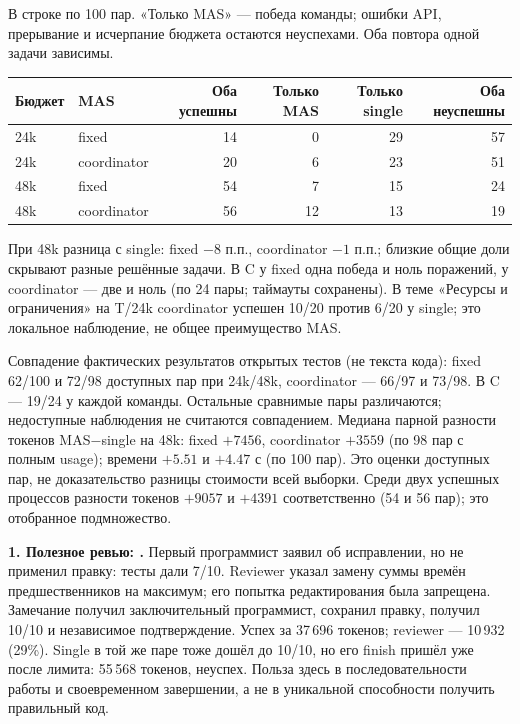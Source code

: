 \documentclass[10pt,a4paper]{article}
\newcommand{\sectionline}[1]{\par\vspace{4pt}{\sffamily\bfseries #1}\par\vspace{2pt}}
\newcommand{\id}[1]{{\fontsize{8}{10}\selectfont\texttt{\detokenize{#1}}}}
\begin{document}
\sectionline{Сравнение на одинаковых task/budget/repeat}
В строке по 100 пар. «Только MAS» --- победа команды; ошибки API, прерывание и
исчерпание бюджета остаются неуспехами. Оба повтора одной задачи зависимы.
\begin{center}\small
\begin{tabular}{llrrrr}
\toprule
Бюджет & MAS & Оба успешны & Только MAS & Только single & Оба неуспешны\\
\midrule
24k & fixed & 14 & 0 & 29 & 57\\
24k & coordinator & 20 & 6 & 23 & 51\\
48k & fixed & 54 & 7 & 15 & 24\\
48k & coordinator & 56 & 12 & 13 & 19\\
\bottomrule
\end{tabular}
\end{center}
При 48k разница с single: fixed $-8$ п.п., coordinator $-1$ п.п.; близкие общие
доли скрывают разные решённые задачи. В C у fixed одна победа и ноль поражений,
у coordinator --- две и ноль (по 24 пары; таймауты сохранены).
В теме «Ресурсы и ограничения» на T/24k coordinator успешен 10/20 против 6/20
у single; это локальное наблюдение, не общее преимущество MAS.

Совпадение фактических результатов открытых тестов (не текста кода): fixed
62/100 и 72/98 доступных пар при 24k/48k, coordinator --- 66/97 и 73/98.
В C --- 19/24 у каждой команды. Остальные сравнимые пары различаются;
недоступные наблюдения не считаются совпадением.
Медиана парной разности токенов MAS$-$single на 48k: fixed $+7456$,
coordinator $+3559$ (по 98 пар с полным usage); времени $+5.51$ и $+4.47$ с
(по 100 пар). Это оценки доступных пар, не доказательство разницы стоимости
всей выборки. Среди двух успешных процессов разности токенов $+9057$
и $+4391$ соответственно (54 и 56 пар); это отобранное подмножество.

\sectionline{Три трассы: слова роли, инструмент, расход}
\textbf{1. Полезное ревью: \id{T43_fixed_b48000_r2}.}
Первый программист заявил об исправлении, но не применил правку: тесты дали
7/10. Reviewer указал замену суммы времён предшественников на максимум;
его попытка редактирования была запрещена. Замечание получил заключительный
программист, сохранил правку, получил 10/10 и независимое подтверждение.
Успех за 37\,696 токенов; reviewer --- 10\,932 (29\%). Single в той же паре
тоже дошёл до 10/10, но его finish пришёл уже после лимита: 55\,568 токенов,
неуспех. Польза здесь в последовательности работы и своевременном завершении,
а не в уникальной способности получить правильный код.
\end{document}
